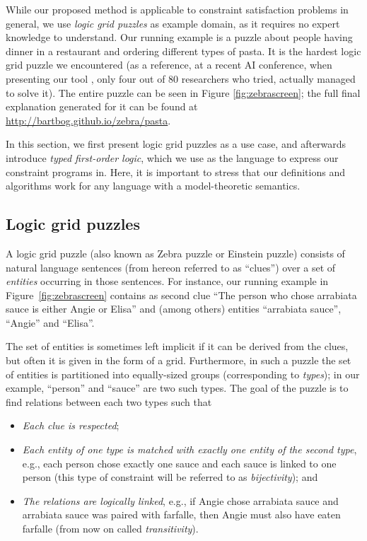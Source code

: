 While our proposed method is applicable to constraint satisfaction problems in general, we use \textit{logic grid puzzles} as example domain, as it requires no expert knowledge to understand.
Our running example is a puzzle about people having dinner in a restaurant and ordering different types of pasta. 
It is the hardest logic grid puzzle we encountered (as a reference, at a recent AI conference, when presenting our tool \cite{DBLP:conf/bnaic/ClaesBCGG19}, only four out of 80 researchers who tried, actually managed to solve it).    
The entire puzzle can be seen in Figure \ref{fig:zebrascreen}; the full final explanation generated for it can be found at \url{http://bartbog.github.io/zebra/pasta}.

In this section, we first present logic grid puzzles as a use case, and afterwards introduce \emph{typed first-order logic}, which we use as the language to express our constraint programs in. Here, it is important to stress that our definitions and algorithms work for any language with a model-theoretic semantics. 


\subsection{Logic grid puzzles}
A logic grid puzzle (also known as Zebra puzzle or Einstein puzzle) consists of natural language sentences (from hereon referred to as ``clues'') over a set of \emph{entities} occurring in those sentences. 
For instance, our running example in Figure~\ref{fig:zebrascreen} contains as second clue ``The person who chose arrabiata sauce is either Angie or Elisa'' and (among others) entities ``arrabiata sauce'', ``Angie'' and ``Elisa''. 

The set of entities is sometimes left implicit if it can be derived from the clues, but often it is given in the form of a grid. 
Furthermore, in such a puzzle the set of entities is partitioned into equally-sized groups (corresponding to \emph{types}); in our example, ``person'' and ``sauce'' are two such types. 
% 
The goal of the puzzle is to find relations between each two types such that
\begin{itemize}
	\item \textit{Each clue is respected}; 
	\item \textit{Each entity of one type is matched with exactly one entity of the second type}, e.g., each person chose exactly one sauce and each sauce is linked to one person (this type of constraint will be referred to as \emph{bijectivity}); and 
	\item \textit{The relations are logically linked}, e.g., if Angie chose arrabiata sauce and arrabiata sauce was paired with farfalle, then Angie must also have eaten farfalle (from now on called \emph{transitivity}). 
\end{itemize}

